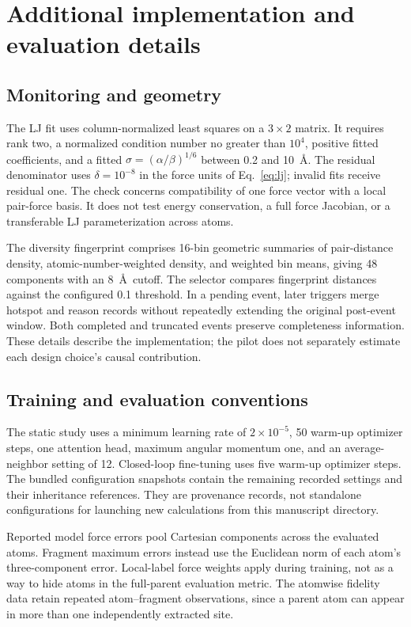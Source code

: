 \section{Additional implementation and evaluation details}
\label{app:settings}
\subsection{Monitoring and geometry}
The LJ fit uses column-normalized least squares on a $3\times2$
matrix. It requires rank two, a normalized condition number no greater
than $10^4$, positive fitted coefficients, and a fitted
$\sigma=(\alpha/\beta)^{1/6}$ between 0.2 and 10~\AA.
The residual denominator uses $\delta=10^{-8}$ in the force units
of Eq.~\eqref{eq:lj}; invalid fits receive residual one.
The check concerns compatibility of one force vector with a local
pair-force basis. It does not test energy conservation, a full force
Jacobian, or a transferable LJ parameterization across atoms.

The diversity fingerprint comprises 16-bin geometric summaries of
pair-distance density, atomic-number-weighted density, and weighted
bin means, giving 48 components with an 8~\AA\ cutoff.
The selector compares fingerprint distances against the configured
0.1 threshold. In a pending event, later triggers merge hotspot and
reason records without repeatedly extending the original post-event
window. Both completed and truncated events preserve completeness
information. These details describe the implementation; the pilot
does not separately estimate each design choice's causal contribution.

\subsection{Training and evaluation conventions}
The static study uses a minimum learning rate of $2\times10^{-5}$,
50 warm-up optimizer steps, one attention head, maximum angular momentum one,
and an average-neighbor setting of 12. Closed-loop fine-tuning uses
five warm-up optimizer steps. The bundled configuration snapshots contain
the remaining recorded settings and their inheritance references.
They are provenance records, not standalone configurations for
launching new calculations from this manuscript directory.

Reported model force errors pool Cartesian components across the
evaluated atoms. Fragment maximum errors instead use the Euclidean
norm of each atom's three-component error. Local-label force weights
apply during training, not as a way to hide atoms in the full-parent
evaluation metric. The atomwise fidelity data retain repeated
atom--fragment observations, since a parent atom can appear in
more than one independently extracted site.

